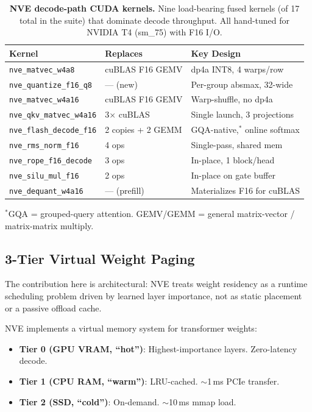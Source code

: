 \documentclass{article}
\begin{document}
\begin{table}[H]
\centering
\caption{\textbf{NVE decode-path CUDA kernels.} Nine load-bearing fused kernels (of
17 total in the suite) that dominate decode throughput. All hand-tuned for NVIDIA T4
(sm\_75) with F16 I/O.}
\label{tab:kernels}
\small
\begin{tabular}{lll}
\toprule
Kernel & Replaces & Key Design \\
\midrule
\texttt{nve\_matvec\_w4a8} & cuBLAS F16 GEMV & dp4a INT8, 4 warps/row \\
\texttt{nve\_quantize\_f16\_q8} & --- (new) & Per-group absmax, 32-wide \\
\texttt{nve\_matvec\_w4a16} & cuBLAS F16 GEMV & Warp-shuffle, no dp4a \\
\texttt{nve\_qkv\_matvec\_w4a16} & 3$\times$ cuBLAS & Single launch, 3 projections \\
\texttt{nve\_flash\_decode\_f16} & 2 copies + 2 GEMM & GQA-native,$^{\ast}$ online softmax \\
\texttt{nve\_rms\_norm\_f16} & 4 ops & Single-pass, shared mem \\
\texttt{nve\_rope\_f16\_decode} & 3 ops & In-place, 1 block/head \\
\texttt{nve\_silu\_mul\_f16} & 2 ops & In-place on gate buffer \\
\texttt{nve\_dequant\_w4a16} & --- (prefill) & Materializes F16 for cuBLAS \\
\bottomrule
\end{tabular}

\smallskip
{\footnotesize $^{\ast}$GQA = grouped-query attention. GEMV/GEMM = general matrix-vector /
matrix-matrix multiply.}
\end{table}


\subsection{3-Tier Virtual Weight Paging}
\label{sec:paging}

The contribution here is architectural: NVE treats weight residency as a runtime
scheduling problem driven by learned layer importance, not as static placement or a
passive offload cache.

NVE implements a virtual memory system for transformer weights:

\begin{itemize}[leftmargin=*, itemsep=1pt]
\item \textbf{Tier 0 (GPU VRAM, ``hot'')}: Highest-importance layers. Zero-latency decode.
\item \textbf{Tier 1 (CPU RAM, ``warm'')}: LRU-cached. $\sim$1\,ms PCIe transfer.
\item \textbf{Tier 2 (SSD, ``cold'')}: On-demand. $\sim$10\,ms mmap load.
\end{itemize}
\end{document}

